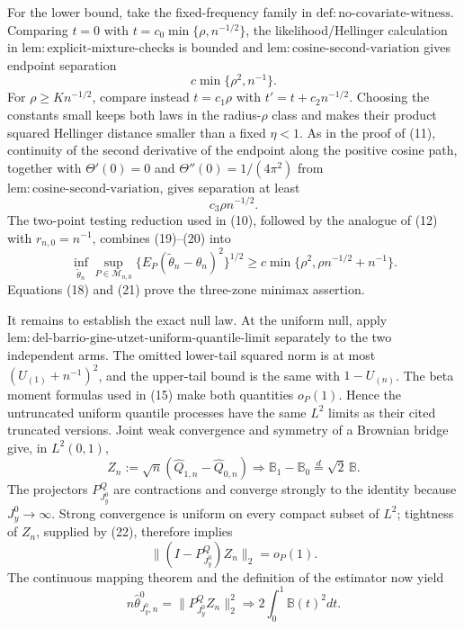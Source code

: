 For the lower bound, take the fixed-frequency family in \(\mathrm{def{:}no\text{-}covariate\text{-}witness}\).  Comparing \(t=0\) with \(t=c_0\min\{\rho,n^{-1/2}\}\), the likelihood/Hellinger calculation in \(\mathrm{lem{:}explicit\text{-}mixture\text{-}checks}\) is bounded and \(\mathrm{lem{:}cosine\text{-}second\text{-}variation}\) gives endpoint separation
\[
 c\min\{\rho^2,n^{-1}\}. \tag{19}
\]
For \(\rho\ge Kn^{-1/2}\), compare instead \(t=c_1\rho\) with \(t'=t+c_2n^{-1/2}\).  Choosing the constants small keeps both laws in the radius-\(\rho\) class and makes their product squared Hellinger distance smaller than a fixed \(\eta<1\).  As in the proof of (11), continuity of the second derivative of the endpoint along the positive cosine path, together with \(\Theta'(0)=0\) and \(\Theta''(0)=1/(4\pi^2)\) from \(\mathrm{lem{:}cosine\text{-}second\text{-}variation}\), gives separation at least
\[
 c_3\rho n^{-1/2}. \tag{20}
\]
The two-point testing reduction used in (10), followed by the analogue of (12) with \(r_{n,0}=n^{-1}\), combines (19)--(20) into
\[
 \inf_{\widetilde\theta_n}\sup_{P\in\mathcal M_{n,0}}
 \{E_P(\widetilde\theta_n-\theta_n)^2\}^{1/2}
 \ge c\min\{\rho^2,\rho n^{-1/2}+n^{-1}\}. \tag{21}
\]
Equations (18) and (21) prove the three-zone minimax assertion.

It remains to establish the exact null law.  At the uniform null, apply \(\mathrm{lem{:}del\text{-}barrio\text{-}gine\text{-}utzet\text{-}uniform\text{-}quantile\text{-}limit}\) separately to the two independent arms.  The omitted lower-tail squared norm is at most \((U_{(1)}+n^{-1})^2\), and the upper-tail bound is the same with \(1-U_{(n)}\).  The beta moment formulas used in (15) make both quantities \(o_P(1)\).  Hence the untruncated uniform quantile processes have the same \(L^2\) limits as their cited truncated versions.  Joint weak convergence and symmetry of a Brownian bridge give, in \(L^2(0,1)\),
\[
 Z_n:=\sqrt n(\widehat Q_{1,n}-\widehat Q_{0,n})
 \Rightarrow \mathbb B_1-\mathbb B_0
 \stackrel{d}{=}\sqrt2\,\mathbb B. \tag{22}
\]
The projectors \(P^Q_{J_y^0}\) are contractions and converge strongly to the identity because \(J_y^0\to\infty\).  Strong convergence is uniform on every compact subset of \(L^2\); tightness of \(Z_n\), supplied by (22), therefore implies
\[
 \|(I-P^Q_{J_y^0})Z_n\|_2=o_P(1).
\]
The continuous mapping theorem and the definition of the estimator now yield
\[
 n\widehat\theta^0_{J_y^0,n}
 =\|P^Q_{J_y^0}Z_n\|_2^2
 \Rightarrow 2\int_0^1\mathbb B(t)^2dt. \tag{23}
\]

